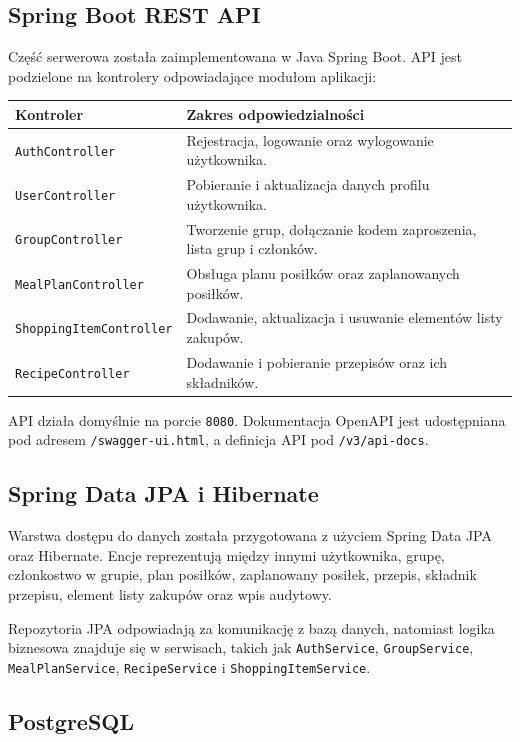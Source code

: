 \documentclass[12pt,a4paper]{article}
\begin{document}
\subsection{Spring Boot REST API}

Część serwerowa została zaimplementowana w Java Spring Boot. API jest podzielone na kontrolery odpowiadające modułom aplikacji:

\begin{longtable}{|p{}|p{}|}
\hline
\textbf{Kontroler} & \textbf{Zakres odpowiedzialności} \\
\hline
\texttt{AuthController} & Rejestracja, logowanie oraz wylogowanie użytkownika. \\
\hline
\texttt{UserController} & Pobieranie i aktualizacja danych profilu użytkownika. \\
\hline
\texttt{GroupController} & Tworzenie grup, dołączanie kodem zaproszenia, lista grup i członków. \\
\hline
\texttt{MealPlanController} & Obsługa planu posiłków oraz zaplanowanych posiłków. \\
\hline
\texttt{ShoppingItemController} & Dodawanie, aktualizacja i usuwanie elementów listy zakupów. \\
\hline
\texttt{RecipeController} & Dodawanie i pobieranie przepisów oraz ich składników. \\
\hline
\end{longtable}

API działa domyślnie na porcie \texttt{8080}. Dokumentacja OpenAPI jest udostępniana pod adresem \texttt{/swagger-ui.html}, a definicja API pod \texttt{/v3/api-docs}.

\subsection{Spring Data JPA i Hibernate}

Warstwa dostępu do danych została przygotowana z użyciem Spring Data JPA oraz Hibernate. Encje reprezentują między innymi użytkownika, grupę, członkostwo w grupie, plan posiłków, zaplanowany posiłek, przepis, składnik przepisu, element listy zakupów oraz wpis audytowy.

Repozytoria JPA odpowiadają za komunikację z bazą danych, natomiast logika biznesowa znajduje się w serwisach, takich jak \texttt{AuthService}, \texttt{GroupService}, \texttt{MealPlanService}, \texttt{RecipeService} i \texttt{ShoppingItemService}.

\subsection{PostgreSQL}
\end{document}
